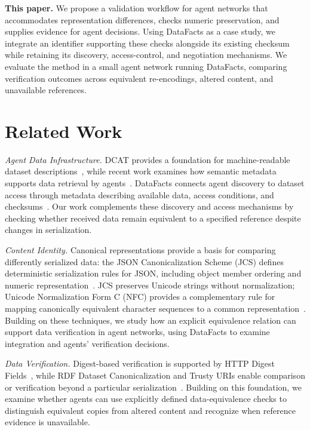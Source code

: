 \documentclass[conference]{IEEEtran}
\begin{document}
\textbf{This paper.} We propose a validation workflow for agent networks that accommodates representation differences, checks numeric preservation, and supplies evidence for agent decisions.
Using DataFacts as a case study, we integrate an identifier supporting these checks alongside its existing checksum while retaining its discovery, access-control, and negotiation mechanisms.
We evaluate the method in a small agent network running DataFacts, comparing verification outcomes across equivalent re-encodings, altered content, and unavailable references.

\section{Related Work}
\emph{Agent Data Infrastructure.} DCAT provides a foundation for machine-readable dataset descriptions~\cite{dcat3}, while recent work examines how semantic metadata supports data retrieval by agents~\cite{chen2026metadata}.
DataFacts connects agent discovery to dataset access through metadata describing available data, access conditions, and checksums~\cite{gao2026datafacts}.
Our work complements these discovery and access mechanisms by checking whether received data remain equivalent to a specified reference despite changes in serialization.

\emph{Content Identity.} Canonical representations provide a basis for comparing differently serialized data: the JSON Canonicalization Scheme (JCS) defines deterministic serialization rules for JSON, including object member ordering and numeric representation~\cite{rfc8785}.
JCS preserves Unicode strings without normalization; Unicode Normalization Form C (NFC) provides a complementary rule for mapping canonically equivalent character sequences to a common representation~\cite{rfc8785,uax15}.
Building on these techniques, we study how an explicit equivalence relation can support data verification in agent networks, using DataFacts to examine integration and agents' verification decisions.

\emph{Data Verification.} Digest-based verification is supported by HTTP Digest Fields~\cite{rfc9530}, while RDF Dataset Canonicalization and Trusty URIs enable comparison or verification beyond a particular serialization~\cite{rdfcanon,trustyuris}.
Building on this foundation, we examine whether agents can use explicitly defined data-equivalence checks to distinguish equivalent copies from altered content and recognize when reference evidence is unavailable.
\end{document}
